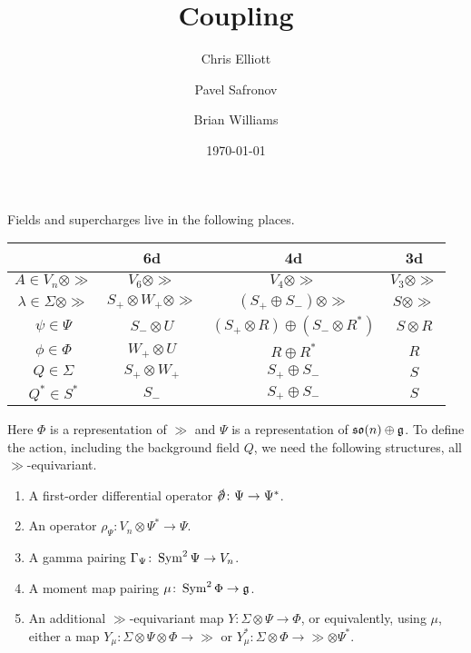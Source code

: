 \documentclass[10pt, oneside]{article}
\title{Coupling}
\author{Chris Elliott\and Pavel Safronov \and Brian Williams}
\date{\today}
\begin{document}
Fields and supercharges live in the following places.

\begin{table}[!h]
\centering
\begin{tabular}[!h]{c|c|c|c}
&6d&4d&3d \\
\hline
$A \in V_n \otimes \gg$& $V_6 \otimes \gg$ &$V_4 \otimes \gg$ & $V_3 \otimes \gg$ \\
$\lambda \in \Sigma \otimes \gg$ &$S_+ \otimes W_+ \otimes \gg$ & $(S_+ \oplus S_-) \otimes \gg$ & $S \otimes \gg$ \\
$\psi \in \Psi$ & $S_- \otimes U$ & $(S_+ \otimes R) \oplus (S_- \otimes R^*)$ & $S \otimes R$ \\
$\phi \in \Phi$ & $W_+ \otimes U$ & $R \oplus R^*$ & $R$ \\
$Q \in \Sigma$ & $S_+ \otimes W_+$ & $S_+ \oplus S_-$ & $S$ \\
$Q^* \in S^*$ & $S_-$ & $S_+ \oplus S_-$ & $S$
\end{tabular}
\end{table}

Here $\Phi$ is a representation of $\gg$ and $\Psi$ is a representation of $\mathfrak{so}(n) \oplus \mathfrak{g}$.  To define the action, including the background field $Q$, we need the following structures, all $\gg$-equivariant. 
\begin{enumerate}
 \item A first-order differential operator $\sd \dd \colon \Psi \to \Psi^*$.
 \item An operator $\rho_\Psi \colon V_n \otimes \Psi^* \to \Psi$.
 \item A gamma pairing $\Gamma_\Psi \colon \operatorname{Sym}^2 \Psi \to V_n$.
 \item A moment map pairing $\mu \colon \operatorname{Sym}^2 \Phi \to \mathfrak{g}$.
 \item An additional $\gg$-equivariant map $Y \colon \Sigma \otimes \Psi \to \Phi$, or equivalently, using $\mu$, either a map $Y_\mu\colon \Sigma \otimes \Psi \otimes \Phi \to \gg$ or $Y_\mu^* \colon \Sigma \otimes \Phi \to \gg \otimes \Psi^*$.
\end{enumerate}
\end{document}

